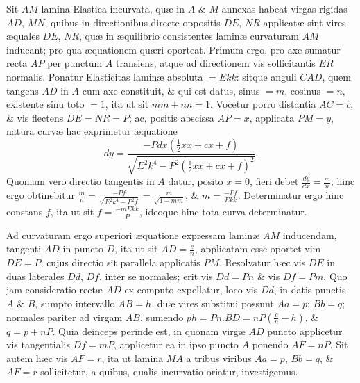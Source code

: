 Sit $AM$ lamina Elastica incurvata, quæ in $A$ \& $M$ annexas habeat virgas rigidas $AD$, $MN$, quibus in directionibus directe oppositis $DE$, $NR$ applicatæ sint vires æquales $DE$, $NR$, quæ in æquilibrio consistentes laminæ curvaturam $AM$ inducant; pro qua æquationem quæri oporteat. Primum ergo, pro axe sumatur recta $AP$ per punctum $A$ transiens, atque ad directionem vis sollicitantis $ER$ normalis. Ponatur Elasticitas laminæ absoluta $=Ekk$: sitque anguli $CAD$, quem tangens $AD$ in $A$ cum axe constituit, \& qui est datus, sinus $=m$, cosinus $=n$, existente sinu toto $=1$, ita ut sit $mm+nn=1$. Vocetur porro distantia $AC=c$, \& vis flectens $DE=NR=P$; ac, positis abscissa $AP=x$, applicata $PM=y$, natura curvæ hac exprimetur æquatione
\[dy=\frac{-Pdx(\frac12xx+cx+f)}{\sqrt{E^2k^4-P^2(\frac12xx+cx+f)^2}}.\]
Quoniam vero directio tangentis in $A$ datur, posito $x=0$, fieri debet $\frac{dy}{dx}=\frac mn$; hinc ergo obtinebitur $\frac mn=\frac{-Pf}{\sqrt{E^2k^4-P^2f}}=\frac m{\sqrt{1-mm}}$, \& $m=\frac{-Pf}{Ekk}$. Determinatur ergo hinc constans $f$, ita ut sit $f=\frac{-mEkk}{P}$, ideoque hinc tota curva determinatur.

Ad curvaturam ergo superiori æquatione expressam laminæ $AM$ inducendam, tangenti $AD$ in puncto $D$, ita ut sit $AD=\frac cn$, applicatam esse oportet vim $DE=P$; cujus directio sit parallela applicatis $PM$. Resolvatur hæc vis $DE$ in duas laterales $Dd$, $Df$, inter se normales; erit vis $Dd=Pn$ \& vis $Df=Pm$. Quo jam consideratio rectæ $AD$ ex computo expellatur, loco vis $Dd$, in datis punctis $A$ \& $B$, sumpto intervallo $AB=h$, duæ vires substitui possunt $Aa=p$; $Bb=q$; normales pariter ad virgam $AB$, sumendo $ph=Pn.BD=nP(\frac cn-h)$, \& $q=p+nP$. Quia deinceps perinde est, in quonam virgæ $AD$ puncto applicetur vis tangentialis $Df=mP$, applicetur ea in ipso puncto $A$ ponendo $AF=nP$. Sit autem hæc vis $AF=r$, ita ut lamina $MA$ a tribus viribus $Aa=p$, $Bb=q$, \& $AF=r$ sollicitetur, a quibus, qualis incurvatio oriatur, investigemus.

